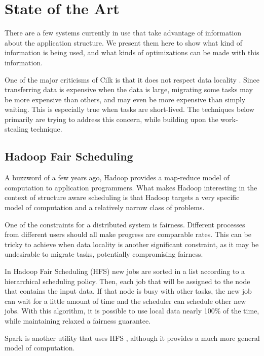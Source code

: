 \documentclass{article}
\begin{document}
\section*{State of the Art}

There are a few systems currently in use that take advantage of information
about the application structure.  We present them here to show what kind of
information is being used, and what kinds of optimizations can be made with this
information.

One of the major criticisms of Cilk is that it does not respect data locality
\autocite{KWKQISXZTLMLIR2016}.  Since transferring data is expensive when the
data is large, migrating some tasks may be more expensive than others, and may
even be more expensive than simply waiting.  This is especially true when tasks
are short-lived.  The techniques below primarily are trying to address this
concern, while building upon the work-stealing technique.


\subsection*{Hadoop Fair Scheduling}

A buzzword of a few years ago, Hadoop \autocite {JDSG2008} provides a map-reduce
model of computation to application programmers.  What makes Hadoop interesting
in the context of structure aware scheduling is that Hadoop targets a very
specific model of computation and a relatively narrow class of problems.

One of the constraints for a distributed system is fairness.  Different
processes from different users should all make progress are comparable rates.
This can be tricky to achieve when data locality is another significant
constraint, as it may be undesirable to migrate tasks, potentially compromising
fairness.

In Hadoop Fair Scheduling (HFS) \autocite{MZKEDBSSJSSIS2010} new jobs are sorted
in a list according to a hierarchical scheduling policy.  Then, each job that
will be assigned to the node that contains the input data.  If that node is busy
with other tasks, the new job can wait for a little amount of time and the
scheduler can schedule other new jobs.  With this algorithm, it is possible to
use local data nearly 100\% of the time, while maintaining relaxed a fairness
guarantee.

Spark \autocite{MZMCMJFSSIS2010} is another utility that uses HFS
\autocite{MZMCTDADJMMMMJFSSIS}, although it provides a much more general model
of computation.  %
\end{document}
